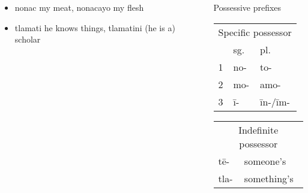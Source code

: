 \documentclass[12pt]{beamer}
\newcommand{\nah}[1]{\textcolor{nahgrn}{#1}}
\newcommand{\trs}[1]{\textcolor{nahblu}{#1}}
\begin{document}
\begin{frame}
\begin{columns}[t]
\begin{column}{.22\linewidth}
\begin{example}
\begin{multicols}{2}
\begin{itemize}
            \item \nah{nonac} \trs{my meat}, \nah{nonacayo} \trs{my flesh}
            \item \nah{tlamati} \trs{he knows things}, \nah{tlamatini} \trs{(he is a) scholar}
          \end{itemize}
        \end{multicols}
      \end{example}
    \end{column}
    \begin{column}{.23\linewidth}
      \begin{block}{Possessive prefixes}
        \begin{tabular}[t]{lll}
          \multicolumn{3}{c}{Specific possessor} \\
            & sg.       & pl.                    \\
          1 & \nah{no-} & \nah{to-}              \\
          2 & \nah{mo-} & \nah{amo-}             \\
          3 & \nah{ī-}  & \nah{īn-/īm-}          \\
        \end{tabular}
        \qquad
        \begin{tabular}[t]{ll}
          \multicolumn{2}{c}{Indefinite possessor} \\
          \nah{tē-}  & \trs{someone's}             \\
          \nah{tla-} & \trs{something's}
        \end{tabular}
      \end{block}


\end{column}
\end{columns}
\end{frame}
\end{document}
